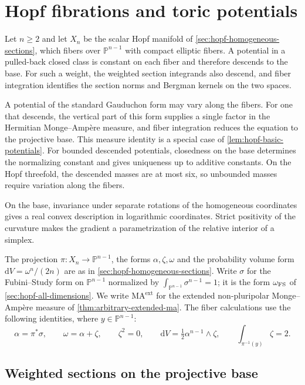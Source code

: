 \chapter{Hopf fibrations and toric potentials}
\label{chap:hopf-reduction}

Let $n\geq2$ and let $X_n$ be the scalar Hopf manifold of \cref{sec:hopf-homogeneous-sections}, which fibers over $\mathbb P^{n-1}$ with compact elliptic fibers. A potential in a pulled-back closed class is constant on each fiber and therefore descends to the base. For such a weight, the weighted section integrands also descend, and fiber integration identifies the section norms and Bergman kernels on the two spaces.

A potential of the standard Gauduchon form may vary along the fibers. For one that descends, the vertical part of this form supplies a single factor in the Hermitian Monge--Amp\`ere measure, and fiber integration reduces the equation to the projective base. This measure identity is a special case of \cref{lem:hopf-basic-potentials}. For bounded descended potentials, closedness on the base determines the normalizing constant and gives uniqueness up to additive constants. On the Hopf threefold, the descended masses are at most six, so unbounded masses require variation along the fibers.

On the base, invariance under separate rotations of the homogeneous coordinates gives a real convex description in logarithmic coordinates. Strict positivity of the curvature makes the gradient a parametrization of the relative interior of a simplex.

The projection $\pi\colon X_n\to\mathbb P^{n-1}$, the forms $\alpha,\zeta,\omega$ and the probability volume form $\mathrm{d}V=\omega^n/(2n)$ are as in \cref{sec:hopf-homogeneous-sections}. Write $\sigma$ for the Fubini--Study form on $\mathbb P^{n-1}$ normalized by $\int_{\mathbb P^{n-1}}\sigma^{n-1}=1$; it is the form $\omega_{\mathrm{FS}}$ of \cref{sec:hopf-all-dimensions}. We write $\mathrm{MA}^{\mathrm{ext}}$ for the extended non-pluripolar Monge--Amp\`ere measure of \cref{thm:arbitrary-extended-ma}. The fiber calculations use the following identities, where $y\in\mathbb P^{n-1}$:
\[
 \alpha=\pi^*\sigma,\qquad \omega=\alpha+\zeta,\qquad
 \zeta^2=0,\qquad
 \mathrm{d}V=\tfrac12\alpha^{n-1}\wedge\zeta,\qquad
 \int_{\pi^{-1}(y)}\zeta=2.
\]

\section{Weighted sections on the projective base}\label{sec:hopf-projective-sections}

